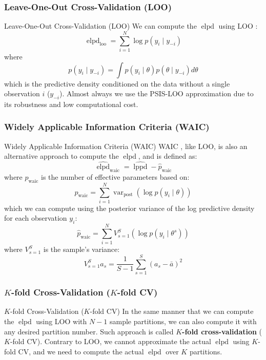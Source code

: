 \subsubsection{Leave-One-Out Cross-Validation (LOO)}
\begin{frame}{Leave-One-Out Cross-Validation (LOO)}
	We can compute the $\operatorname{elpd}$ using LOO
	\parencite{vehtariPracticalBayesianModel2015}:
	$$
		\operatorname{elpd}_{\text{loo}} = \sum_{i=1}^N \log p(y_i \mid y_{-i})
	$$
	where
	$$
		p(y_i \mid y_{-i}) = \int p(y_i \mid \theta) p(\theta \mid y_{-i}) d \theta
	$$
	which is the predictive density conditioned on the data without a single observation $i$ ($y_{-i}$).
	Almost always we use the PSIS-LOO approximation
	due to its robustness and low computational cost.
\end{frame}

\subsubsection{Widely Applicable Information Criteria (WAIC)}
\begin{frame}{Widely Applicable Information Criteria (WAIC)}
	\footnotesize
	WAIC \parencite{watanabe2010asymptotic}, like LOO,
	is also an alternative approach to compute the $\operatorname{elpd}$,
	and is defined as:
	$$
		\widehat{\operatorname{elpd}}_{\text{waic}} = \widehat{\operatorname{lppd}} - \widehat{p}_{\text{waic}}
	$$
	where $\widehat{p}_{\text{waic}}$ is the number of effective parameters based on:
	$$
		\widehat{p}_{\text{waic}} = \sum_{i=1}^N \operatorname{var}_{\text{post}} (\log p(y_i \mid \theta))
	$$
	which we can compute using the posterior variance of the log predictive density for each observation $y_i$:
	$$
		\widehat{p}_{\text{waic}} = \sum_{i=1}^N V^S_{s=1} (\log p(y_i \mid \theta^s))
	$$
	where $V^S_{s=1}$ is the sample's variance:
	$$
		V^S_{s=1} a_s = \frac{1}{S-1} \sum^S_{s=1} (a_s - \bar{a})^2
	$$
\end{frame}

\subsubsection{$K$-fold Cross-Validation ($K$-fold CV)}
\begin{frame}{$K$-fold Cross-Validation ($K$-fold CV)}
	In the same manner that we can compute the $\operatorname{elpd}$
	using LOO with $N-1$ sample partitions,
	we can also compute it with any desired partition number.
	\vfill
	Such approach is called \textbf{$K$-fold cross-validation} ($K$-fold CV).
	\vfill
	Contrary to LOO, we cannot approximate the actual $\operatorname{elpd}$
	using $K$-fold CV,
	and we need to compute the actual $\operatorname{elpd}$ over $K$ partitions.
\end{frame}

